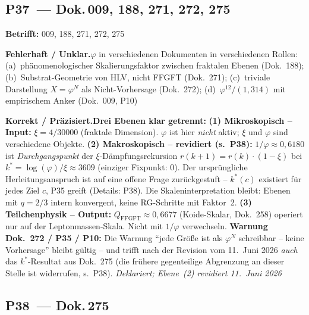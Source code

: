 \medskip


\subsection*{P37~--- Dok.\,009, 188, 271, 272, 275}

\noindent\textbf{Betrifft:} 009, 188, 271, 272, 275


\smallskip\noindent\textbf{Fehlerhaft / Unklar.}\quad $\varphi$ in verschiedenen Dokumenten in verschiedenen Rollen: (a)~phänomenologischer Skalierungsfaktor zwischen fraktalen Ebenen (Dok.~188); (b)~Substrat-Geometrie von HLV, nicht FFGFT (Dok.~271); (c)~triviale Darstellung $X=\varphi^N$ als Nicht-Vorhersage (Dok.~272); (d)~$\varphi^{12}/(1{,}314)$ mit empirischem Anker (Dok.~009, P10)


\smallskip\noindent\textbf{Korrekt / Präzisiert.}\quad \textbf{Drei Ebenen klar getrennt:}
  \newline
  \textbf{(1) Mikroskopisch -- Input:} $\xi = 4/30000$ (fraktale Dimension). $\varphi$ ist hier \emph{nicht} aktiv; $\xi$ und $\varphi$ sind verschiedene Objekte.
  \newline
  \textbf{(2) Makroskopisch -- revidiert (s.\ P38):} $1/\varphi \approx 0{,}6180$ ist \emph{Durchgangspunkt} der $\xi$-Dämpfungsrekursion $r(k+1)=r(k)\cdot(1-\xi)$ bei $k^* = \log(\varphi)/\xi \approx 3609$ (einziger Fixpunkt: $0$). Der ursprüngliche Herleitungsanspruch ist auf eine offene Frage zurückgestuft -- $k^*(c)$ existiert für jedes Ziel $c$, P35 greift (Details: P38). Die Skaleninterpretation bleibt: Ebenen mit $q=2/3$ intern konvergent, keine RG-Schritte mit Faktor~2.
  \newline
  \textbf{(3) Teilchenphysik -- Output:} $Q_\mathrm{FFGFT}\approx 0{,}6677$ (Koide-Skalar, Dok.~258) operiert nur auf der Leptonmassen-Skala. Nicht mit $1/\varphi$ verwechseln.
  \newline
  \textbf{Warnung Dok.~272 / P35 / P10:} Die Warnung \enquote{jede Größe ist als $\varphi^N$ schreibbar -- keine Vorhersage} bleibt gültig -- und trifft nach der Revision vom 11.~Juni 2026 \emph{auch} das $k^*$-Resultat aus Dok.~275 (die frühere gegenteilige Abgrenzung an dieser Stelle ist widerrufen, s.\ P38). \emph{Deklariert; Ebene~(2) revidiert 11.~Juni 2026}


\medskip


\subsection*{P38~--- Dok.\,275}

